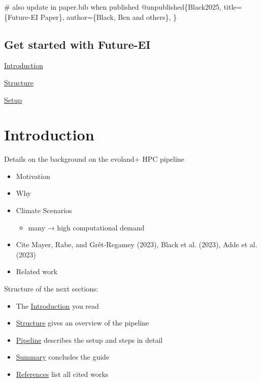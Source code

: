 \documentclass[
  letterpaper,
  DIV=11,
  numbers=noendperiod]{scrreprt}
\newenvironment{Shaded}{\begin{snugshade}}{\end{snugshade}}
\newcommand{\CommentTok}[1]{\textcolor[rgb]{0.37,0.37,0.37}{#1}}
\newcommand{\DataTypeTok}[1]{\textcolor[rgb]{0.68,0.00,0.00}{#1}}
\newcommand{\NormalTok}[1]{\textcolor[rgb]{0.00,0.23,0.31}{#1}}
\newcommand{\OtherTok}[1]{\textcolor[rgb]{0.00,0.23,0.31}{#1}}
\newcommand{\VariableTok}[1]{\textcolor[rgb]{0.07,0.07,0.07}{#1}}
\providecommand{\tightlist}{%
  \setlength{\itemsep}{0pt}\setlength{\parskip}{0pt}}\usepackage{longtable,booktabs,array}
\begin{document}
\begin{Shaded}
\begin{Highlighting}[]
\CommentTok{\# also update in paper.bib when published}
\VariableTok{@unpublished}\NormalTok{\{}\OtherTok{Black2025}\NormalTok{,}
  \DataTypeTok{title}\NormalTok{=\{Future{-}EI Paper\},}
  \DataTypeTok{author}\NormalTok{=\{Black, Ben and others\},}
\NormalTok{\}}
\end{Highlighting}
\end{Shaded}

\section*{Get started with Future-EI}\label{get-started-with-future-ei}


\href{intro.qmd}{Introduction}

\href{structure.qmd}{Structure}

\href{pipeline/setup.qmd}{Setup}


\chapter{Introduction}\label{introduction}

Details on the background on the evoland+ HPC pipeline

\begin{itemize}
\tightlist
\item
  Motivation
\item
  Why
\item
  Climate Scenarios

  \begin{itemize}
  \tightlist
  \item
    many → high computational demand
  \end{itemize}
\item
  Cite Mayer, Rabe, and Grêt-Regamey (2023), Black et al. (2023), Adde
  et al. (2023)
\item
  Related work
\end{itemize}

Structure of the next sections:

\begin{itemize}
\tightlist
\item
  The \hyperref[introduction]{Introduction} you read
\item
  \href{structure.html}{Structure} gives an overview of the pipeline
\item
  \href{pipeline/}{Pipeline} describes the setup and steps in detail
\item
  \href{summary.html}{Summary} concludes the guide
\item
  \href{references.html}{References} list all cited works
\end{itemize}
\end{document}

